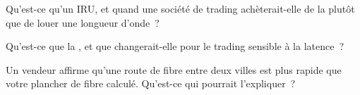 \begin{interviewq}\label{iq:nw:long-haul-fibre:4}
Qu'est-ce qu'un IRU, et quand une société de trading achèterait-elle de la  plutôt que de louer une longueur d'onde~?
\end{interviewq}

\begin{interviewq}\label{iq:nw:long-haul-fibre:5}
Qu'est-ce que la , et que changerait-elle pour le trading sensible à la latence~?
\end{interviewq}

\begin{interviewq}\label{iq:nw:long-haul-fibre:6}
Un vendeur affirme qu'une route de fibre entre deux villes est plus rapide que votre plancher de fibre calculé. Qu'est-ce qui pourrait l'expliquer~?
\end{interviewq}
